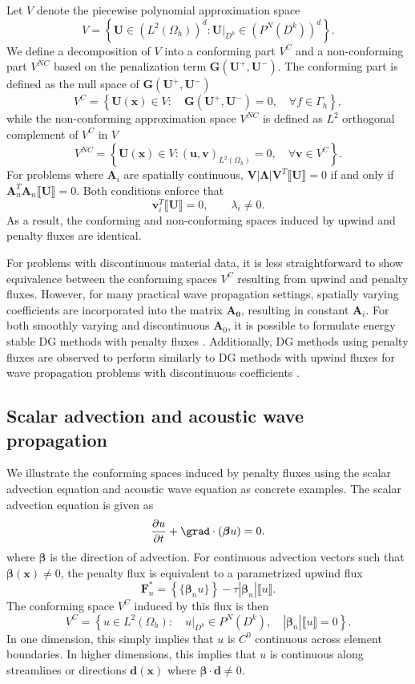 \documentclass[10pt]{article}
\renewcommand{\div}{\grad \cdot}
\newcommand{\pd}[2]{\frac{\partial#1}{\partial#2}}
\newcommand{\LRp}[1]{\left( #1 \right)}
\newcommand{\LRb}[1]{\left| #1 \right|}
\newcommand{\LRc}[1]{\left\{ #1 \right\}}
\newcommand{\jump}[1] {\ensuremath{\llbracket#1\rrbracket}}
\newcommand{\avg}[1] {\ensuremath{\LRc{\!\{#1\}\!}}}
\newcommand{\Gh}{\Gamma_h}
\newcommand{\Oh}{\Omega_h}
\newcommand{\note}[1]{{\color{blue}#1}}
\begin{document}
Let $V$ denote the piecewise polynomial approximation space 
\[
V = \LRc{ \bm{U} \in\LRp{ L^2(\Oh)}^d : \left.\bm{U}\right|_{D^k} \in \LRp{P^N(D^k)}^d}.  
\]
We define a decomposition of $V$ into a conforming part $V^C$ and a non-conforming part $V^{NC}$ based on the penalization term $\bm{G}(\bm{U}^+,\bm{U}^-)$.  The conforming part is defined as the null space of $\bm{G}(\bm{U}^+,\bm{U}^-)$
\begin{equation}
V^{C} = \LRc{ \bm{U}(\bm{x}) \in V: \quad  \bm{G}(\bm{U}^+,\bm{U}^-) = 0, \quad \forall f \in \Gh},
\label{eq:conf}
\end{equation}
while the non-conforming approximation space $V^{NC}$ is defined as $L^2$ orthogonal complement of $V^{C}$ in $V$
\[
V^{NC} = \LRc{ \bm{U}(\bm{x}) \in V: \LRp{\bm{u},\bm{v}}_{L^2(\Oh)} = 0, \quad \forall \bm{v}\in V^C}.
\]
\note{For problems where $\bm{A}_i$ are spatially continuous, $\bm{V}\LRb{\bm{\Lambda}}\bm{V}^T \jump{\bm{U}} = 0$ if and only if $\bm{A}_n^T \bm{A}_n\jump{\bm{U}} = 0$.  Both conditions enforce that 
\[
\bm{v}_i^T \jump{\bm{U}} = 0, \qquad \lambda_i \neq 0.
\]
}
As a result, the conforming and non-conforming spaces induced by upwind and penalty fluxes are identical.  

For problems with discontinuous material data, it is less straightforward to show equivalence between the conforming spaces $V^C$ resulting from upwind and penalty fluxes.  However, for many practical wave propagation settings, spatially varying coefficients are incorporated into the matrix $\bm{A_0}$, resulting in constant $\bm{A}_i$.  For both smoothly varying and discontinuous $\bm{A}_0$, it is possible to formulate energy stable DG methods with penalty fluxes \cite{mercerat2015nodal, chan2016weight1}.  Additionally, DG methods using penalty fluxes are observed to perform similarly to DG methods with upwind fluxes for  wave propagation problems with discontinuous coefficients \cite{warburton2013low, chan2016weight1, ye2016discontinuous}.  

\subsection{Scalar advection and acoustic wave propagation}
\label{sec:confexamples}
We illustrate the conforming spaces induced by penalty fluxes using the scalar advection equation and acoustic wave equation as concrete examples.  The scalar advection equation is given as
\[
\pd{u}{t} + \div\LRp{\bm{\beta}u} = 0.
\]
where $\bm{\beta}$ is the direction of advection.  For continuous advection vectors such that $\bm{\beta}(\bm{x}) \neq 0$, the penalty flux is equivalent to a parametrized upwind flux \cite{hesthaven2007nodal}
\[
\bm{F}^*_n = \avg{\bm{\beta}_n u} - \tau\LRb{\bm{\beta}_n}\jump{u}.
\]
The conforming space $V^C$ induced by this flux is then
\[
V^C = \LRc{ u \in L^2\LRp{\Oh} : \quad \left.u\right|_{D^k} \in P^N(D^k), \quad \LRb{\bm{\beta}_n}\jump{u} = 0}.
\]
In one dimension, this simply implies that $u$ is $C^0$ continuous across element boundaries.  In higher dimensions, this implies that $u$ is continuous along streamlines or directions $\bm{d}(\bm{x})$ where $\bm{\beta}\cdot \bm{d} \neq 0$.  
\end{document}
